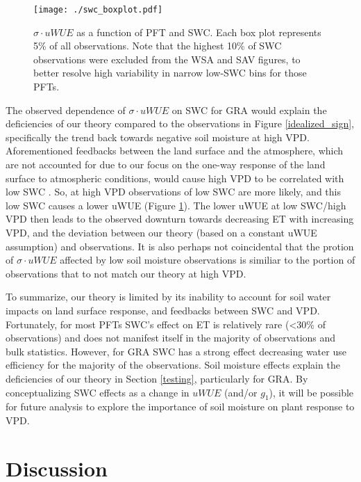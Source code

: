 \documentclass[draft,linenumbers]{agujournal}
\begin{document}
\begin{figure}
\centering
\centerline{\texttt{[image: ./swc\_boxplot.pdf]}}
\caption{$\sigma \cdot uWUE$ as a function of PFT and SWC. Each box plot represents 5\% of all observations. Note that the highest 10\% of SWC observations were excluded from the WSA and SAV figures, to better resolve high variability in narrow low-SWC bins for those PFTs.}
\label{swc_boxplot}
\end{figure}

The observed dependence of $\sigma \cdot uWUE$ on SWC for GRA would explain the deficiencies of our theory compared to the observations in Figure \ref{idealized_sign}, specifically the trend back towards negative soil moisture at high VPD. Aforementioned feedbacks between the land surface and the atmosphere, which are not accounted for due to our focus on the one-way response of the land surface to atmospheric conditions, would cause high VPD to be correlated with low SWC \citep[][]{Gentine_2016, Berg_2016}. So, at high VPD observations of low SWC are more likely, and this low SWC causes a lower uWUE (Figure \ref{swc_boxplot}). The lower uWUE at low SWC/high VPD then leads to the observed downturn towards decreasing ET with increasing VPD, and the deviation between our theory (based on a constant uWUE assumption) and observations. It is also perhaps not coincidental that the protion of $\sigma \cdot uWUE$ affected by low soil moisture observations is similiar to the portion of observations that to not match our theory at high VPD.

To summarize, our theory is limited by its inability to account for soil water impacts on land surface response, and feedbacks between SWC and VPD. Fortunately, for most PFTs SWC's effect on ET is relatively rare (<30\% of observations) and does not manifest itself in the majority of observations and bulk statistics. However, for GRA SWC has a strong effect decreasing water use efficiency for the majority of the observations. Soil moisture effects explain the deficiencies of our theory in Section \ref{testing}, particularly for GRA. By conceptualizing SWC effects as a change in $uWUE$ (and/or $g_1$), it will be possible for future analysis to explore the importance of soil moisture on plant response to VPD.

\section{Discussion} 
\end{document}
